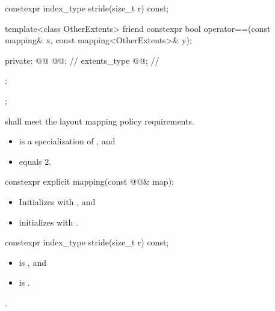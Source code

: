 \begin{codeblock}
{{{      constexpr index_type stride(size_t r) const;

      template<class OtherExtents>
        friend constexpr bool operator==(const mapping& x, const mapping<OtherExtents>& y);

    private:
      @@ @@;                       // \expos
      extents_type @@;                                     // \expos
    };
  };
}
\end{codeblock}

\pnum
{} shall meet
the layout mapping policy requirements.

\pnum
\mandates
\begin{itemize}
\item
{} is a specialization of , and
\item
{} equals 2.
\end{itemize}

%
\begin{itemdecl}
constexpr explicit mapping(const @@& map);
\end{itemdecl}

\begin{itemdescr}
\pnum
\effects
\begin{itemize}
\item
Initializes  with , and
\item
initializes 
with .
\end{itemize}
\end{itemdescr}

%
\begin{itemdecl}
constexpr index_type stride(size_t r) const;
\end{itemdecl}

\begin{itemdescr}
\pnum
\expects
\begin{itemize}
\item
{} is , and
\item
{} is .
\end{itemize}

\pnum
\returns
{}.
\end{itemdescr}

